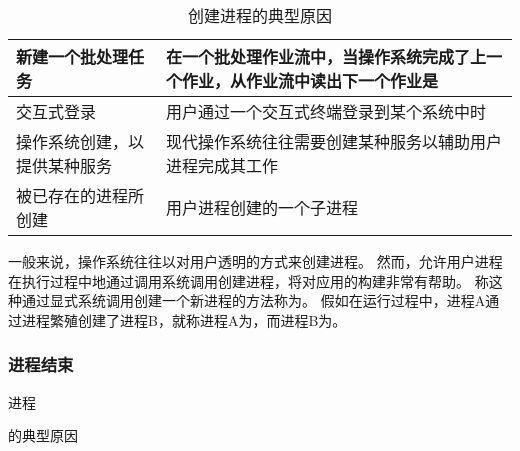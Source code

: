 {{{            \begin{table}[htb]
                \centering

                \caption{创建进程的典型原因}

                \begin{tabular}{l|l}
                    \hline
                    新建一个批处理任务 & 在一个批处理作业流中，当操作系统完成了上一个作业，从作业流中读出下一个作业是 \\
                    \hline
                    交互式登录 & 用户通过一个交互式终端登录到某个系统中时 \\
                    \hline
                    操作系统创建，以提供某种服务 & 现代操作系统往往需要创建某种服务以辅助用户进程完成其工作 \\
                    \hline
                    被已存在的进程所创建 & 用户进程创建的一个子进程 \\
                    \hline
                \end{tabular}
            \end{table}

            一般来说，操作系统往往以对用户透明的方式来创建进程。
            然而，允许用户进程在执行过程中地通过调用系统调用创建进程，将对应用的构建非常有帮助。
            称这种通过显式系统调用创建一个新进程的方法称为。
            假如在运行过程中，进程A通过进程繁殖创建了进程B，就称进程A为，而进程B为。
        }

        \subsubsection{进程结束}
        {
            \begin{table}[htb]
                \centering

                \caption{进程}的典型原因


\end{table}}}}
